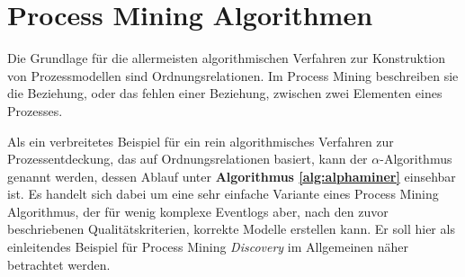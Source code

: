 

\section{Process Mining Algorithmen}
Die Grundlage für die allermeisten algorithmischen Verfahren zur Konstruktion von Prozessmodellen sind Ordnungsrelationen. Im Process Mining beschreiben sie die Beziehung, oder das fehlen einer Beziehung, zwischen zwei Elementen eines Prozesses. 

Als ein verbreitetes  Beispiel für ein rein algorithmisches Verfahren zur Prozessentdeckung, das auf Ordnungsrelationen basiert, kann der $\alpha$-Algorithmus genannt werden, dessen Ablauf unter \textbf{ Algorithmus \ref{alg:alphaminer}} einsehbar ist.
Es handelt sich dabei um eine sehr einfache Variante eines Process Mining Algorithmus, der für wenig komplexe Eventlogs aber, nach den zuvor beschriebenen Qualitätskriterien, korrekte Modelle erstellen kann. Er soll hier als einleitendes Beispiel für Process Mining \textit{Discovery} im Allgemeinen näher betrachtet werden. \newline

